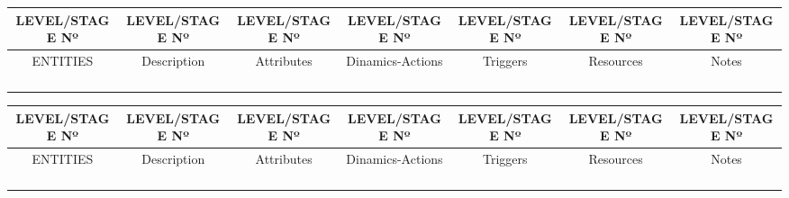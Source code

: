 \documentclass[12pt]{article}
\begin{document}
\vspace{0.5cm}
\begin{tabular}{|c|c|c|c|c|c|c|}
\hline
LEVEL/STAGE  Nº & LEVEL/STAGE  Nº & LEVEL/STAGE  Nº & LEVEL/STAGE  Nº & LEVEL/STAGE  Nº & LEVEL/STAGE  Nº & LEVEL/STAGE  Nº \\ \hline
ENTITIES & Description & Attributes & Dinamics-Actions & Triggers & Resources & Notes \\ \hline
 &  &  &  &  &  &  \\ \hline
 &  &  &  &  &  &  \\ \hline
 &  &  &  &  &  &  \\ \hline
 &  &  &  &  &  &  \\ \hline
\end{tabular}
\vspace{0.5cm}
\begin{tabular}{|c|c|c|c|c|c|c|}
\hline
LEVEL/STAGE  Nº & LEVEL/STAGE  Nº & LEVEL/STAGE  Nº & LEVEL/STAGE  Nº & LEVEL/STAGE  Nº & LEVEL/STAGE  Nº & LEVEL/STAGE  Nº \\ \hline
ENTITIES & Description & Attributes & Dinamics-Actions & Triggers & Resources & Notes \\ \hline
 &  &  &  &  &  &  \\ \hline
 &  &  &  &  &  &  \\ \hline
 &  &  &  &  &  &  \\ \hline
 &  &  &  &  &  &  \\ \hline
\end{tabular}
\vspace{0.5cm}
\end{document}
